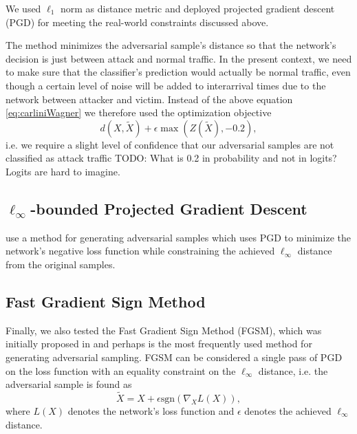 \documentclass[sigconf,nonacm]{acmart}
\newcommand\note[2]{{\color{#1}#2}}
\newcommand\todo[1]{{\note{red}{TODO: #1}}}
\begin{document}
We used $\ell_1$ norm as distance metric and deployed projected gradient descent (PGD) for meeting the real-world constraints discussed above.

The method minimizes the adversarial sample's distance so that the network's decision is just between attack and normal traffic. In the present context, we need to make sure that the classifier's prediction would actually be normal traffic, even though a certain level of noise will be added to interarrival times due to the network between attacker and victim. Instead of the above equation \ref{eq:carliniWagner} we therefore used the optimization objective
\begin{equation}
d(X,\tilde X) + \epsilon  \max(Z(\tilde X), -0.2),
\end{equation}
i.e. we require a slight level of confidence that our adversarial samples are not classified as attack traffic \todo{What is 0.2 in probability and not in logits? Logits are hard to imagine}.

\subsection{$\ell_\infty$-bounded Projected Gradient Descent}
\cite{madry2017towards} use a method for generating adversarial samples which uses PGD  to minimize the network's negative loss function while constraining the achieved $\ell_\infty$ distance from the original samples.

\subsection{Fast Gradient Sign Method}
Finally, we also tested the Fast Gradient Sign Method (FGSM), which was initially proposed in \cite{goodfellow2014explaining} and perhaps is the most frequently used method for generating adversarial sampling. FGSM can be considered a single pass of PGD on the loss function with an equality constraint on the $\ell_\infty$ distance, i.e. the adversarial sample is found as
\begin{equation}
\tilde X = X + \epsilon \text{sgn}( \nabla_X L(X)),
\end{equation}
where $L(X)$ denotes the network's loss function and $\epsilon$ denotes the achieved $\ell_\infty$ distance.
\end{document}

